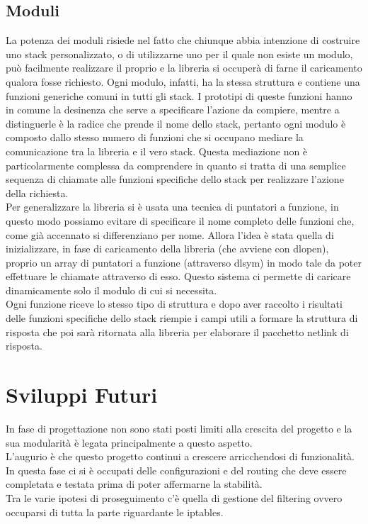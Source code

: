 \subsection{Moduli}
La potenza dei moduli risiede nel fatto che chiunque abbia intenzione di costruire uno stack personalizzato, o di utilizzarne uno per il quale non esiste un modulo, pu\`o facilmente realizzare il proprio e la libreria si occuper\`a di farne il caricamento qualora fosse richiesto.
Ogni modulo, infatti, ha la stessa struttura e contiene una funzioni generiche comuni in tutti gli stack. I prototipi di queste funzioni hanno in comune la desinenza che serve a specificare l'azione da compiere, mentre a distinguerle \`e la radice che prende il nome dello stack, pertanto ogni modulo \`e composto dallo stesso numero di funzioni che si occupano mediare la comunicazione tra la libreria e il vero stack. Questa mediazione non \`e particolarmente complessa da comprendere in quanto si tratta di una semplice sequenza di chiamate alle funzioni specifiche dello stack per realizzare l'azione della richiesta.\\
Per generalizzare la libreria si \`e usata una tecnica di puntatori a funzione, in questo modo possiamo evitare di specificare il nome completo delle funzioni che, come gi\`a accennato si differenziano per nome. Allora l'idea \`e stata quella di inizializzare, in fase di caricamento della libreria (che avviene con dlopen), proprio un array di puntatori a funzione (attraverso dlsym) in modo tale da poter effettuare le chiamate attraverso di esso. Questo sistema ci permette di caricare dinamicamente solo il modulo di cui si necessita.\\
Ogni funzione riceve lo stesso tipo di struttura e dopo aver raccolto i risultati delle funzioni specifiche dello stack riempie i campi utili a formare la struttura di risposta che poi sar\`a ritornata alla libreria per elaborare il pacchetto netlink di risposta.
\section{Sviluppi Futuri}
In fase di progettazione non sono stati posti limiti alla crescita del progetto e la sua modularit\`a \`e legata principalmente a questo aspetto.\\
L'augurio \`e che questo progetto continui a crescere arricchendosi di funzionalit\`a.\\
In questa fase ci si \`e occupati delle configurazioni e del routing che deve essere completata e testata prima di poter affermarne la stabilit\`a.\\
Tra le varie ipotesi di proseguimento c'\`e quella di gestione del filtering ovvero occuparsi di tutta la parte riguardante le iptables.
\clearpage{\pagestyle{empty}\cleardoublepage} 
